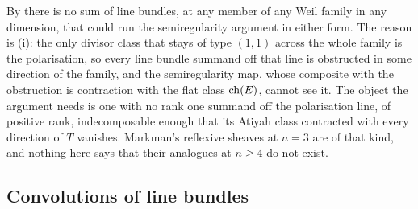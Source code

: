 \begin{remark}\label{rem:nolinemeaning}
By  there is no sum of line bundles, at any member of any
Weil family in any dimension, that could run the semiregularity argument in
either form. The reason is (i): the
only divisor class that stays of type $(1,1)$ across the whole family is the
polarisation, so every line bundle summand off that line is obstructed in
some direction of the family, and the semiregularity map, whose composite
with the obstruction is contraction with the flat class $\operatorname{ch}(E)$, cannot see
it. The object the argument needs is one with no rank one
summand off the polarisation line, of positive rank, indecomposable enough
that its Atiyah class contracted with every direction of $T$ vanishes.
Markman's reflexive sheaves at $n=3$ are of that kind, and nothing here
says that their analogues at $n\ge4$ do not exist.
\end{remark}

\subsection{Convolutions of line bundles}\label{ssec:convolutions}

